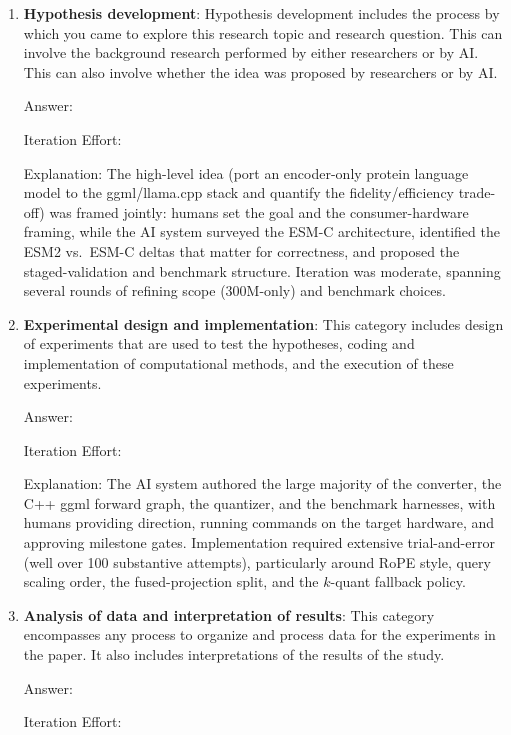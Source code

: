 \documentclass{article}
\begin{document}
\begin{enumerate}

    \item \textbf{Hypothesis development}: Hypothesis development includes the process by which you came to explore this research topic and research question. This can involve the background research performed by either researchers or by AI. This can also involve whether the idea was proposed by researchers or by AI.

    Answer: \involvementB{}

    Iteration Effort: \iterationMedium{}

    Explanation: The high-level idea (port an encoder-only protein language model to the ggml/llama.cpp stack and quantify the fidelity/efficiency trade-off) was framed jointly: humans set the goal and the consumer-hardware framing, while the AI system surveyed the ESM-C architecture, identified the ESM2 vs.\ ESM-C deltas that matter for correctness, and proposed the staged-validation and benchmark structure. Iteration was moderate, spanning several rounds of refining scope (300M-only) and benchmark choices.

    \item \textbf{Experimental design and implementation}: This category includes design of experiments that are used to test the hypotheses, coding and implementation of computational methods, and the execution of these experiments.

    Answer: \involvementC{}

    Iteration Effort: \iterationHigh{}

    Explanation: The AI system authored the large majority of the converter, the C++ ggml forward graph, the quantizer, and the benchmark harnesses, with humans providing direction, running commands on the target hardware, and approving milestone gates. Implementation required extensive trial-and-error (well over 100 substantive attempts), particularly around RoPE style, query scaling order, the fused-projection split, and the $k$-quant fallback policy.

    \item \textbf{Analysis of data and interpretation of results}: This category encompasses any process to organize and process data for the experiments in the paper. It also includes interpretations of the results of the study.

    Answer: \involvementC{}

    Iteration Effort: \iterationMedium{}


\end{enumerate}
\end{document}
